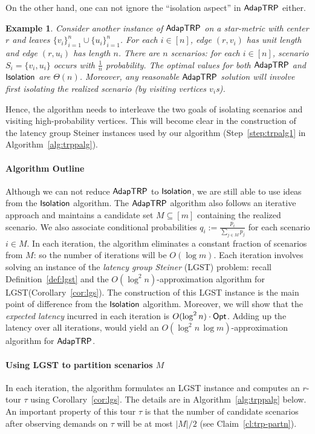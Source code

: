 \documentclass[11pt]{article}
\newtheorem{example}{Example}
\def\sse{\subseteq}
\def\opt{{\sf Opt}\xspace}
\def\isoprob{\ensuremath{{\sf Isolation}}\xspace}
\def\strp{\ensuremath{{\sf AdapTRP}}\xspace}
\def\lgs{{\sf LGST}\xspace}
\begin{document}
On the other hand, one can not ignore
the ``isolation aspect'' in \strp either.

\smallskip\begin{example}
Consider another instance of \strp 
on a star-metric with center $r$ and leaves $\{v_i\}_{i=1}^n\cup \{u_i\}_{i=1}^n$. For each $i\in[n]$, edge $(r,v_i)$ has unit length and edge $(r,u_i)$ has length $n$. There
are $n$ scenarios: for each $i\in[n]$, scenario $S_i=\{v_i,u_i\}$ occurs with $\frac1n$ probability. The optimal values for both \strp and \isoprob are $\Theta(n)$. Moreover, any reasonable \strp solution will involve first isolating the realized scenario (by visiting vertices $v_i$s).
\end{example}

\smallskip



Hence, the algorithm needs to interleave the two goals of isolating scenarios and visiting high-probability vertices. This will become clear in the construction of the  latency group Steiner  instances used by our algorithm (Step~\ref{step:trpalg1} in Algorithm~\ref{alg:trppalg}).





\paragraph{Algorithm Outline} Although we can not reduce \strp to \isoprob, we are still able to use ideas from the \isoprob algorithm. The \strp algorithm also follows an iterative approach and maintains a candidate set  $M\sse [m]$ containing the realized scenario. 
We also associate conditional probabilities $q_i:=\frac{p_i}{\sum_{j\in M} p_j}$ for each scenario $i\in M$. In each iteration, the algorithm eliminates a constant fraction of scenarios from $M$: so the number of iterations will be $O(\log m)$. Each iteration involves solving  an instance of the 
{\em latency group Steiner} (\lgs) problem: recall Definition~\ref{def:lgst} and the $O(\log^2n)$-approximation algorithm for \lgs (Corollary~\ref{cor:lgs}). The construction of this \lgs instance is the main point of difference from the \isoprob algorithm. Moreover, we will show that the {\em expected latency} incurred in each iteration is $O(\log^2n)\cdot \opt$. Adding up the latency over all iterations, would yield an $O(\log^2n\,\log m)$-approximation algorithm for \strp.
 
 
 
\paragraph{Using \lgs to partition scenarios $M$} In each iteration, the algorithm formulates an \lgs instance and computes an $r$-tour $\tau$ using Corollary~\ref{cor:lgs}. The details are in Algorithm~\ref{alg:trppalg} below. An important property of this tour $\tau$ is that the number of  candidate scenarios after observing demands on $\tau$ will be at most $|M|/2$ (see Claim~\ref{cl:trp-partn}).
\end{document}
